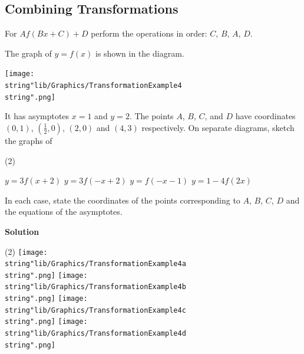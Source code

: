 \documentclass[11pt,a4paper]{book}
\begin{document}
\newpage


\subsection{Combining Transformations}

For $Af(Bx+C)+D$ perform the operations in order: $C$, $B$, $A$, $D$.

\begin{example}{}

The graph of $y=f\left(x\right)$ is shown in the diagram.
\begin{center}
\texttt{[image: \\string"lib/Graphics/TransformationExample4\\string".png]}
\par\end{center}

It has asymptotes $x=1$ and $y=2$. The points $A$, $B$, $C$,
and $D$ have coordinates $\left(0,1\right)$, ${\displaystyle \left(\frac{1}{2},0\right)}$,
$\left(2,0\right)$ and $\left(4,3\right)$ respectively. On separate diagrams, sketch the graphs of

\begin{tasks}[label=(\alph*),label-width=3.5ex] (2)

\task $y=3f\left(x+2\right)$
\task $y=3f\left(-x+2\right)$
\task $y=f\left(-x-1\right)$
\task  $y=1-4f\left(2x\right)$

\end{tasks}


In each case, state the coordinates of the points corresponding to
$A$, $B$, $C$, $D$ and the equations of the asymptotes.

\textbf{Solution}

\begin{tasks}[label=(\alph*),label-width=3.5ex] (2)
\task \texttt{[image: \\string"lib/Graphics/TransformationExample4a\\string".png]}
\task \texttt{[image: \\string"lib/Graphics/TransformationExample4b\\string".png]}
\task \texttt{[image: \\string"lib/Graphics/TransformationExample4c\\string".png]}
\task \texttt{[image: \\string"lib/Graphics/TransformationExample4d\\string".png]}
\end{tasks}

\end{example}
\end{document}
